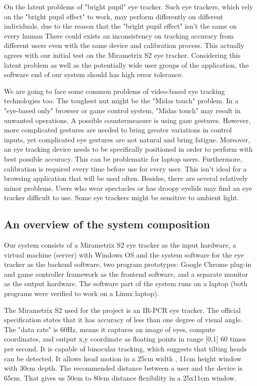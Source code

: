 \documentclass[english]{tktltiki}
\begin{document}
On the latent problems of "bright pupil" eye tracker. Such eye trackers, which rely on the "bright pupil effect" to work, may perform differently on different individuals, due to the reason that the "bright pupil effect" isn't the same on every human \cite{Nguyen:2002:DIB:507072.507099} There could exists an inconsistency on tracking accuracy from different users even with the same device and calibration process. This actually agrees with our initial test on the Mirametrix S2 eye tracker. Considering this latent problem as well as the potentially wide user groups of the application, the software end of our system should has high error tolerance.

We are going to face some common problems of video-based eye tracking technologies too. The toughest nut might be the "Midas touch" problem.\cite{Velichkovsky97} In a "eye-based only" browser or game control system, "Midas touch" may result in unwanted operations. A possible countermeasure is using gaze gestures. \cite{Ohno:1998:FEG:786112.786297} However, more complicated gestures are needed to bring greater variations in control inputs, yet complicated eye gestures are not natural and bring fatigue. Moreover, an eye tracking device needs to be specifically positioned in order to perform with best possible accuracy. This can be problematic for laptop users.  Furthermore, calibration is required every time before use for every user. This isn't ideal for a browsing application that will be used often. Besides, there are several relatively minor problems. Users who wear spectacles or has droopy eyelids may find an eye tracker difficult to use. Some eye trackers might be sensitive to ambient light. 

\subsection{An overview of the system composition}

Our system consists of a Mirametrix S2 eye tracker as the input hardware, a virtual machine (server) with Windows OS and the system software for the eye tracker as the backend software, two program prototypes: Google Chrome plug-in and game controller framework as the frontend software, and a separate monitor as the output hardware. The software part of the system runs on a laptop (both programs were verified to work on a Linux laptop).

The Mirametrix S2 used for the project is an IR-PCR eye tracker. The official specification states that it has accuracy of less than one degree of visual angle. The "data rate" is 60Hz, means it captures an image of eyes, compute coordinates, and output x,y coordinate as floating points in range [0,1] 60 times per second. It is capable of binocular tracking, which suggests that tilting heads can be detected. It allows head motion in a 25cm width , 11cm height window with 30cm depth. The recommended distance between a user and the device is 65cm. That gives us 50cm to 80cm distance flexibility in a 25x11cm window. 
\end{document}
